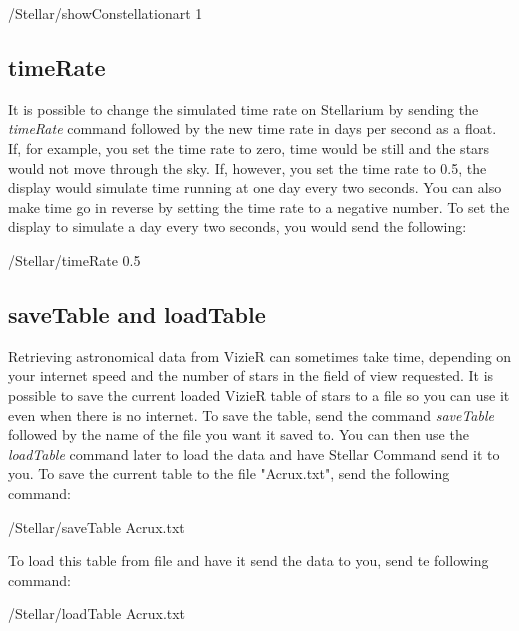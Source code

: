 \begin{syntax}	
	\medskip
	/Stellar/showConstellationart 1
	\medskip
\end{syntax}

\subsection{timeRate}
It is possible to change the simulated time rate on Stellarium by sending the \textit{timeRate} command followed by the new time rate in days per second as a float. If, for example, you set the time rate to zero, time would be still and the stars would not move through the sky. If, however, you set the time rate to 0.5, the display would simulate time running at one day every two seconds. You can also make time go in reverse by setting the time rate to a negative number. To set the display to simulate a day every two seconds, you would send the following:

\begin{syntax}	
	\medskip
	/Stellar/timeRate 0.5
	\medskip
\end{syntax}

\subsection{saveTable and loadTable}
Retrieving astronomical data from VizieR can sometimes take time, depending on your internet speed and the number of stars in the field of view requested. It is possible to save the current loaded VizieR table of stars to a file so you can use it even when there is no internet. To save the table, send the command \textit{saveTable} followed by the name of the file you want it saved to. You can then use the \textit{loadTable} command later to load the data and have Stellar Command send it to you.
To save the current table to the file "Acrux.txt", send the following command:
 
 \begin{syntax}	
 	\medskip
 	/Stellar/saveTable Acrux.txt
 	\medskip
 \end{syntax}

To load this table from file and have it send the data to you, send te following command:
 \begin{syntax}	
	\medskip
	/Stellar/loadTable Acrux.txt
	\medskip
\end{syntax}